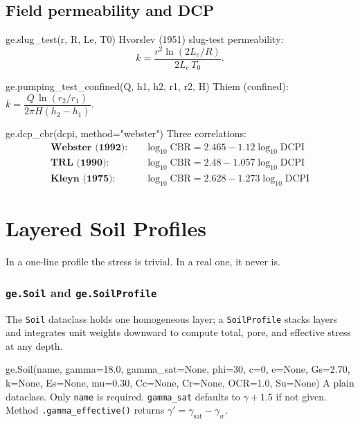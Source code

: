\documentclass[11pt,a4paper,openany]{book}
\newcommand{\gammaw}{\gamma_w}
\begin{document}
\section{Field permeability and DCP}

\begin{funcbox}{ge.slug\_test(r, R, Le, T0)}
Hvorslev (1951) slug-test permeability:
\[
k = \frac{r^2 \ln(2 L_e / R)}{2 L_e\,T_0}.
\]
\end{funcbox}

\begin{funcbox}{ge.pumping\_test\_confined(Q, h1, h2, r1, r2, H)}
Thiem (confined): $k = \dfrac{Q\,\ln(r_2/r_1)}{2\pi H (h_2 - h_1)}$.
\end{funcbox}

\begin{funcbox}{ge.dcp\_cbr(dcpi, method="webster")}
Three correlations:
\begin{align*}
\textbf{Webster (1992):} &\quad \log_{10}\text{CBR} = 2.465 - 1.12\log_{10}\text{DCPI} \\
\textbf{TRL (1990):}     &\quad \log_{10}\text{CBR} = 2.48 - 1.057\log_{10}\text{DCPI} \\
\textbf{Kleyn (1975):}   &\quad \log_{10}\text{CBR} = 2.628 - 1.273\log_{10}\text{DCPI}
\end{align*}
\end{funcbox}

\chapter{Layered Soil Profiles}\label{ch:profile}

\epigraph{In a one-line profile the stress is trivial.
In a real one, it never is.}{}

\subsection*{\texttt{ge.Soil} and \texttt{ge.SoilProfile}}

The \texttt{Soil} dataclass holds one homogeneous layer; a
\texttt{SoilProfile} stacks layers and integrates unit weights
downward to compute total, pore, and effective stress at any
depth.

\begin{funcbox}{ge.Soil(name, gamma=18.0, gamma\_sat=None, phi=30, c=0, e=None, Gs=2.70, k=None, Es=None, mu=0.30, Cc=None, Cr=None, OCR=1.0, Su=None)}
A plain dataclass. Only \texttt{name} is required. \texttt{gamma\_sat}
defaults to $\gamma + 1.5$ if not given. Method
\texttt{.gamma\_effective()} returns $\gamma' = \gamma_{\text{sat}}
- \gammaw$.
\end{funcbox}
\end{document}
